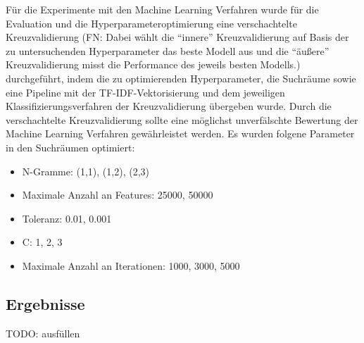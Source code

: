 \documentclass[11pt]{article}
\providecommand{\tightlist}{%
      \setlength{\itemsep}{0pt}\setlength{\parskip}{0pt}}
\begin{document}
Für die Experimente mit den Machine Learning Verfahren wurde für die
Evaluation und die Hyperparameteroptimierung eine verschachtelte
Kreuzvalidierung (FN: Dabei wählt die ``innere'' Kreuzvalidierung auf
Basis der zu untersuchenden Hyperparameter das beste Modell aus und die
``äußere'' Kreuzvalidierung misst die Performance des jeweils besten
Modells.) durchgeführt, indem die zu optimierenden Hyperparameter, die
Suchräume sowie eine Pipeline mit der TF-IDF-Vektorisierung und dem
jeweiligen Klassifizierungsverfahren der Kreuzvalidierung übergeben
wurde. Durch die verschachtelte Kreuzvalidierung sollte eine möglichst
unverfälschte Bewertung der Machine Learning Verfahren gewährleistet
werden. Es wurden folgene Parameter in den Suchräumen optimiert:

\begin{itemize}
\tightlist
\item
  N-Gramme: (1,1), (1,2), (2,3)
\item
  Maximale Anzahl an Features: 25000, 50000
\item
  Toleranz: 0.01, 0.001
\item
  C: 1, 2, 3
\item
  Maximale Anzahl an Iterationen: 1000, 3000, 5000
\end{itemize}

    \hypertarget{ergebnisse}{%
\subsection{Ergebnisse}\label{ergebnisse}}

TODO: ausfüllen
\end{document}
